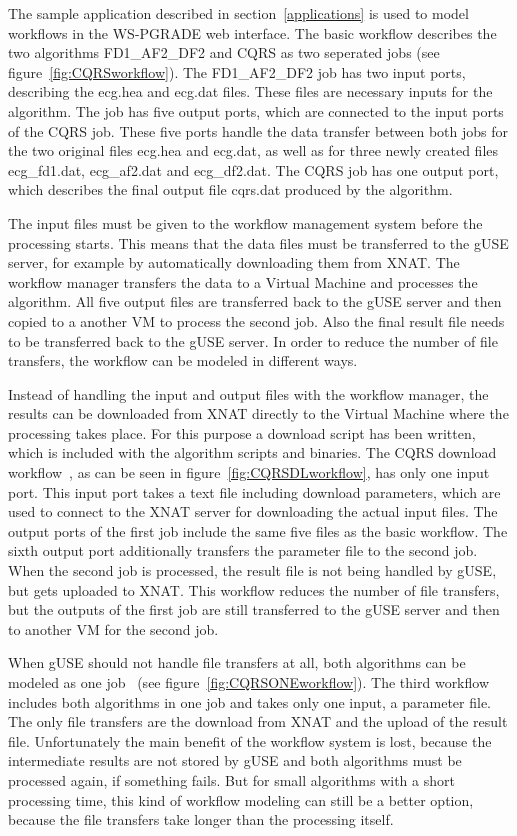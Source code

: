 The sample application described in section~\ref{applications} is used to model workflows in the WS-PGRADE web interface.
The basic workflow \cite{somnocqrs} describes the two algorithms FD1\_AF2\_DF2 and CQRS as two seperated jobs (see figure~\ref{fig:CQRSworkflow}).
The FD1\_AF2\_DF2 job has two input ports, describing the ecg.hea and ecg.dat files.
These files are necessary inputs for the algorithm.
The job has five output ports, which are connected to the input ports of the CQRS job.
These five ports handle the data transfer between both jobs for the two original files ecg.hea and ecg.dat, as well as for three newly created files ecg\_fd1.dat, ecg\_af2.dat and ecg\_df2.dat.
The CQRS job has one output port, which describes the final output file cqrs.dat produced by the algorithm.

The input files must be given to the workflow management system before the processing starts.
This means that the data files must be transferred to the gUSE server, for example by automatically downloading them from XNAT.
The workflow manager transfers the data to a Virtual Machine and processes the algorithm.
All five output files are transferred back to the gUSE server and then copied to a another VM to process the second job.
Also the final result file needs to be transferred back to the gUSE server.
In order to reduce the number of file transfers, the workflow can be modeled in different ways.

Instead of handling the input and output files with the workflow manager, the results can be downloaded from XNAT directly to the Virtual Machine where the processing takes place.
For this purpose a download script has been written, which is included with the algorithm scripts and binaries.
The CQRS download workflow~\cite{somnocqrsdl}, as can be seen in figure~\ref{fig:CQRSDLworkflow}, has only one input port.
This input port takes a text file including download parameters, which are used to connect to the XNAT server for downloading the actual input files.
The output ports of the first job include the same five files as the basic workflow.
The sixth output port additionally transfers the parameter file to the second job.
When the second job is processed, the result file is not being handled by gUSE, but gets uploaded to XNAT.
This workflow reduces the number of file transfers, but the outputs of the first job are still transferred to the gUSE server and then to another VM for the second job.

When gUSE should not handle file transfers at all, both algorithms can be modeled as one job~\cite{somnocqrsone} (see figure~\ref{fig:CQRSONEworkflow}).
The third workflow includes both algorithms in one job and takes only one input, a parameter file.
The only file transfers are the download from XNAT and the upload of the result file.
Unfortunately the main benefit of the workflow system is lost, because the intermediate results are not stored by gUSE and both algorithms must be processed again, if something fails.
But for small algorithms with a short processing time, this kind of workflow modeling can still be a better option, because the file transfers take longer than the processing itself.

